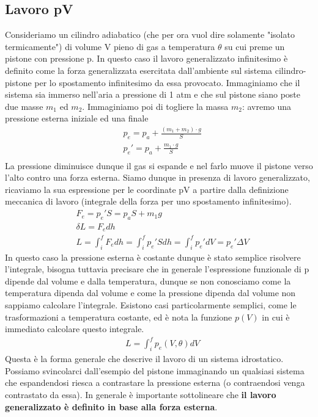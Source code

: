 \documentclass[
10pt, %
a4paper, %
oneside, %
headinclude,footinclude, %
BCOR5mm, %
]{scrartcl}
\begin{document}
\subsection{Lavoro pV}
Consideriamo un cilindro adiabatico (che per ora vuol dire solamente "isolato termicamente") di volume V pieno di gas a temperatura $\theta$ su cui preme un pistone con pressione p. In questo caso il lavoro generalizzato infinitesimo è definito come la forza generalizzata esercitata dall'ambiente sul sistema cilindro-pistone per lo spostamento infinitesimo da essa provocato. Immaginiamo che il sistema sia immerso nell'aria a pressione di 1 atm e che sul pistone siano poste due masse $m_1$ ed $m_2$. Immaginiamo poi di togliere la massa $m_2$: avremo una pressione esterna iniziale ed una finale
\begin{align*} 
	&p_e=p_a+\frac{(m_1+m_2)\cdot g}{S}\\
	&p_e'=p_a+\frac{m_1\cdot g}{S}\\
\end{align*} 
La pressione diminuisce dunque il gas si espande e nel farlo muove il pistone verso l'alto contro una forza esterna. Siamo dunque in presenza di lavoro generalizzato, ricaviamo la sua espressione per le coordinate pV a partire dalla definizione meccanica di lavoro (integrale della forza per uno spostamento infinitesimo). 
\begin{align*} 
	&F_e = p_e' S = p_a S + m_1 g\\
	&\delta L = F_e dh\\
	&L= \int_{i}^{f}F_e dh = \int_{i}^{f} p_e' S dh = \int_{i}^{f} p_e' dV = p_e' \Delta V
\end{align*} 
In questo caso la pressione esterna è costante dunque è stato semplice risolvere l'integrale, bisogna tuttavia precisare che in generale l'espressione funzionale di p dipende dal volume e dalla temperatura, dunque se non conosciamo come la temperatura dipenda dal volume e come la pressione dipenda dal volume non sappiamo calcolare l'integrale. Esistono casi particolarmente semplici, come le trasformazioni a temperatura costante, ed è nota la funzione $p(V)$ in cui è immediato calcolare questo integrale.
\begin{align*} 
	&L= \int_{i}^{f} p_e(V,\theta) dV
\end{align*} 
Questa è la forma generale che descrive il lavoro di un sistema idrostatico. Possiamo svincolarci dall'esempio del pistone immaginando un qualsiasi sistema che espandendosi riesca a contrastare la pressione esterna (o contraendosi venga contrastato da essa). In generale è importante sottolineare che \textbf{il lavoro generalizzato è definito in base alla forza esterna}. \\
\end{document}
